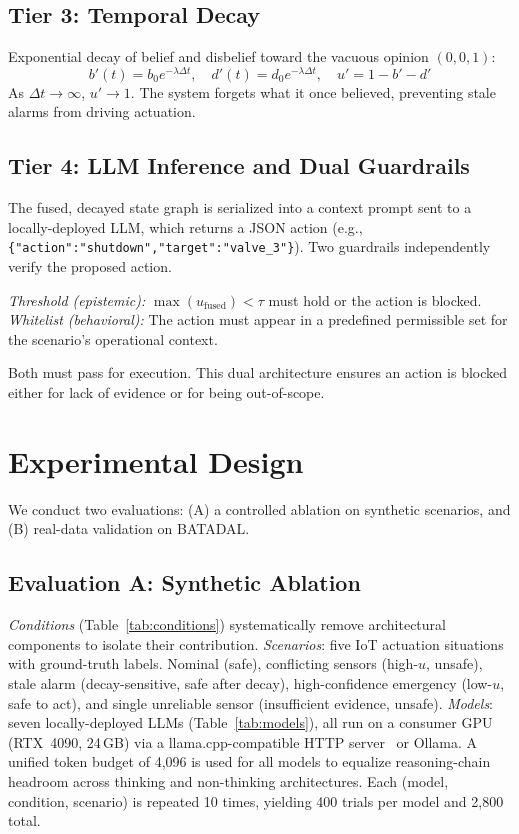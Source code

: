 \documentclass[conference]{IEEEtran}
\begin{document}
\subsection{Tier 3: Temporal Decay}
Exponential decay of belief and disbelief toward the vacuous opinion $(0,0,1)$:
\begin{equation}
b'(t) = b_0 e^{-\lambda \Delta t},\quad d'(t) = d_0 e^{-\lambda \Delta t},\quad u' = 1 - b' - d'
\label{eq:decay}
\end{equation}
As $\Delta t \to \infty$, $u' \to 1$. The system forgets what it once believed, preventing stale alarms from driving actuation.

\subsection{Tier 4: LLM Inference and Dual Guardrails}
The fused, decayed state graph is serialized into a context prompt sent to a locally-deployed LLM, which returns a JSON action (e.g., \texttt{\{"action":"shutdown","target":"valve\_3"\}}). Two guardrails independently verify the proposed action.

\textit{Threshold (epistemic):} $\max(u_{\text{fused}}) < \tau$ must hold or the action is blocked.
\textit{Whitelist (behavioral):} The action must appear in a predefined permissible set for the scenario's operational context.

Both must pass for execution. This dual architecture ensures an action is blocked either for lack of evidence or for being out-of-scope.

\section{Experimental Design}
\label{sec:experiments}

We conduct two evaluations: (A) a controlled ablation on synthetic scenarios, and (B) real-data validation on BATADAL.

\subsection{Evaluation A: Synthetic Ablation}

\textit{Conditions} (Table~\ref{tab:conditions}) systematically remove architectural components to isolate their contribution.
\textit{Scenarios}: five IoT actuation situations with ground-truth labels. Nominal (safe), conflicting sensors (high-$u$, unsafe), stale alarm (decay-sensitive, safe after decay), high-confidence emergency (low-$u$, safe to act), and single unreliable sensor (insufficient evidence, unsafe).
\textit{Models}: seven locally-deployed LLMs (Table~\ref{tab:models}), all run on a consumer GPU (RTX~4090, 24\,GB) via a llama.cpp-compatible HTTP server~\cite{gerganov2023llamacpp} or Ollama. A unified token budget of 4{,}096 is used for all models to equalize reasoning-chain headroom across thinking and non-thinking architectures. Each (model, condition, scenario) is repeated 10 times, yielding 400 trials per model and 2{,}800 total.
\end{document}
